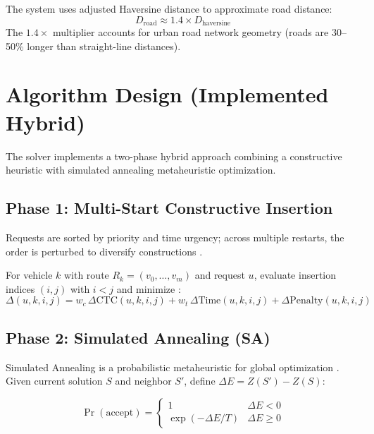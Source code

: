 \documentclass[11pt,a4paper]{article}
\begin{document}
The system uses adjusted Haversine distance to approximate road distance:
\begin{equation}
D_{\text{road}} \approx 1.4 \times D_{\text{haversine}}
\end{equation}
The $1.4\times$ multiplier accounts for urban road network geometry (roads are 30--50\% longer than straight-line distances).

\section{Algorithm Design (Implemented Hybrid)}

The solver implements a two-phase hybrid approach combining a constructive heuristic with simulated annealing metaheuristic optimization.

\subsection{Phase 1: Multi-Start Constructive Insertion}

Requests are sorted by priority and time urgency; across multiple restarts, the order is perturbed to diversify constructions \cite{solomon1987,cordeau2002}.

For vehicle $k$ with route $R_k=(v_0,\dots,v_m)$ and request $u$, evaluate insertion indices $(i,j)$ with $i<j$ and minimize \cite{solomon1987}:
\begin{equation}
\Delta(u,k,i,j)= w_c\,\Delta\text{CTC}(u,k,i,j)+ w_t\,\Delta\text{Time}(u,k,i,j) + \Delta\text{Penalty}(u,k,i,j)
\end{equation}

\subsection{Phase 2: Simulated Annealing (SA)}

Simulated Annealing is a probabilistic metaheuristic for global optimization \cite{kirkpatrick1983}. Given current solution $S$ and neighbor $S'$, define $\Delta E = Z(S')-Z(S)$:

\begin{equation}
\Pr(\text{accept})=
\begin{cases}
1 & \Delta E<0\\
\exp(-\Delta E/T) & \Delta E\ge 0
\end{cases}
\end{equation}
\end{document}
